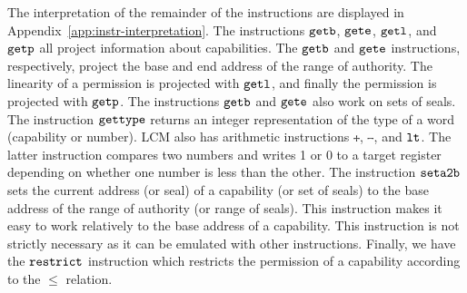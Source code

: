 \documentclass{jfp}
\newcommand{\trgcm}{\textsc{LCM}}
\newenvironment{jversion}{}{}
\begin{document}
\begin{jversion}
  The interpretation of the remainder of the instructions are displayed in Appendix~\ref{app:instr-interpretation}.
  The instructions $\tgetb{}{}$, $\tgete{}{}$, $\tgetlin{}{}$, and $\tgetp{}{}$ all project information about capabilities.
  The $\tgetb{}{}$ and $\tgete{}{}$ instructions, respectively, project the base and end address of the range of authority.
  The linearity of a permission is projected with $\tgetlin{}{}$, and finally the permission is projected with $\tgetp{}{}$.
  The instructions $\tgetb{}{}$ and $\tgete{}{}$ also work on sets of seals.
  The instruction $\tisptr{}{}$ returns an integer representation of the type of a word (capability or number).
  \trgcm{} also has arithmetic instructions $\tplus{}{}{}$, $\tminus{}{}{}$, and $\tlt{}{}{}$.
  The latter instruction compares two numbers and writes 1 or 0 to a target register depending on whether one number is less than the other.
  The instruction $\tsetatob{}$ sets the current address (or seal) of a capability (or set of seals) to the base address of the range of authority (or range of seals).
  This instruction makes it easy to work relatively to the base address of a capability.
  This instruction is not strictly necessary as it can be emulated with other instructions.
  Finally, we have the $\trestrict{}{}$ instruction which restricts the permission of a capability according to the $\le$ relation.
\end{jversion}
\end{document}
